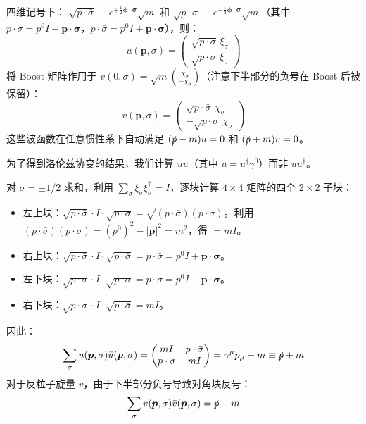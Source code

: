 四维记号下： $\sqrt{p\cdot\bar{\sigma}} \equiv e^{+\frac{1}{2}\boldsymbol{\phi}\cdot\boldsymbol{\sigma}}\sqrt{m}$ 和 $\sqrt{p\cdot\sigma} \equiv e^{-\frac{1}{2}\boldsymbol{\phi}\cdot\boldsymbol{\sigma}}\sqrt{m}$（其中 $p\cdot\sigma = p^0 I - \boldsymbol{p}\cdot\boldsymbol{\sigma}$，$p\cdot\bar{\sigma} = p^0 I + \boldsymbol{p}\cdot\boldsymbol{\sigma}$），则：
\begin{equation}
    \boxed{u(\boldsymbol{p},\sigma) = \begin{pmatrix} \sqrt{p\cdot\bar{\sigma}}\,\xi_\sigma \\ \sqrt{p\cdot\sigma}\,\xi_\sigma \end{pmatrix}}
\end{equation}
将 Boost 矩阵作用于 $v(0,\sigma) = \sqrt{m}\binom{\chi_\sigma}{-\chi_\sigma}$（注意下半部分的负号在 Boost 后被保留）：
\begin{equation}
    \boxed{v(\boldsymbol{p},\sigma) = \begin{pmatrix} \sqrt{p\cdot\bar{\sigma}}\,\chi_\sigma \\ -\sqrt{p\cdot\sigma}\,\chi_\sigma \end{pmatrix}}
\end{equation}
这些波函数在任意惯性系下自动满足 $(\slashed{p}-m)u=0$ 和 $(\slashed{p}+m)v=0$。
\vspace{2ex}\par
为了得到洛伦兹协变的结果，我们计算 $u\bar{u}$（其中 $\bar{u}=u^\dagger\gamma^0$）而非 $uu^\dagger$。

对 $\sigma = \pm 1/2$ 求和，利用 $\sum_\sigma\xi_\sigma\xi_\sigma^\dagger = I$，逐块计算 $4\times 4$ 矩阵的四个 $2\times 2$ 子块：
\begin{itemize}
    \item 左上块：$\sqrt{p\cdot\bar{\sigma}}\cdot I\cdot\sqrt{p\cdot\sigma} = \sqrt{(p\cdot\bar{\sigma})(p\cdot\sigma)}$。利用 $(p\cdot\bar{\sigma})(p\cdot\sigma) = (p^0)^2 - |\boldsymbol{p}|^2 = m^2$，得 $= mI$。
    \item 右上块：$\sqrt{p\cdot\bar{\sigma}}\cdot I\cdot\sqrt{p\cdot\bar{\sigma}} = p\cdot\bar{\sigma} = p^0 I + \boldsymbol{p}\cdot\boldsymbol{\sigma}$。
    \item 左下块：$\sqrt{p\cdot\sigma}\cdot I\cdot\sqrt{p\cdot\sigma} = p\cdot\sigma = p^0 I - \boldsymbol{p}\cdot\boldsymbol{\sigma}$。
    \item 右下块：$\sqrt{p\cdot\sigma}\cdot I\cdot\sqrt{p\cdot\bar{\sigma}} = mI$。
\end{itemize}
因此：
\begin{equation}
    \sum_\sigma u(\boldsymbol{p},\sigma)\bar{u}(\boldsymbol{p},\sigma) = \begin{pmatrix} mI & p\cdot\bar{\sigma} \\ p\cdot\sigma & mI \end{pmatrix} = \gamma^\mu p_\mu + m \equiv \slashed{p}+m
    \label{eq:pol_u}
\end{equation}
对于反粒子旋量 $v$，由于下半部分负号导致对角块反号：
\begin{equation}
   \sum_\sigma v(\boldsymbol{p},\sigma)\bar{v}(\boldsymbol{p},\sigma) = \slashed{p}-m
    \label{eq:pol_v}
\end{equation}


